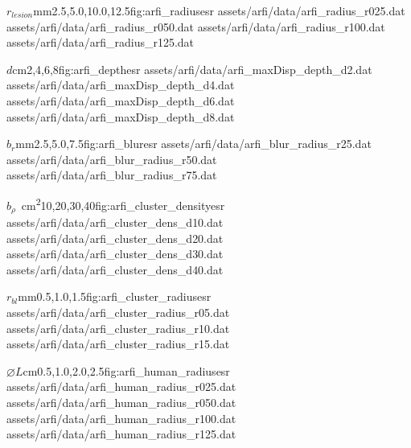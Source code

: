 		\begin{multicols*}{2}
			\characterizationDataTable%
				{$r_{lesion}$}{mm}{2.5,5.0,10.0,12.5}{fig:arfi_radius}{esr}%
				{assets/arfi/data/arfi_radius_r025.dat}%
				{assets/arfi/data/arfi_radius_r050.dat}%
				{assets/arfi/data/arfi_radius_r100.dat}%
				{assets/arfi/data/arfi_radius_r125.dat}

			\characterizationDataTable%
				{$d$}{cm}{2,4,6,8}{fig:arfi_depth}{esr}%
				{assets/arfi/data/arfi_maxDisp_depth_d2.dat}%
				{assets/arfi/data/arfi_maxDisp_depth_d4.dat}%
				{assets/arfi/data/arfi_maxDisp_depth_d6.dat}%
				{assets/arfi/data/arfi_maxDisp_depth_d8.dat}

			\characterizationDataTable%
				{$b_r$}{mm}{2.5,5.0,7.5}{fig:arfi_blur}{esr}%
				{assets/arfi/data/arfi_blur_radius_r25.dat}%
				{assets/arfi/data/arfi_blur_radius_r50.dat}%
				{assets/arfi/data/arfi_blur_radius_r75.dat}%
				{}

			\characterizationDataTable%
				{$b_\rho$}{\si{\per\cm\squared}}{10,20,30,40}{fig:arfi_cluster_density}{esr}%
				{assets/arfi/data/arfi_cluster_dens_d10.dat}%
				{assets/arfi/data/arfi_cluster_dens_d20.dat}%
				{assets/arfi/data/arfi_cluster_dens_d30.dat}%
				{assets/arfi/data/arfi_cluster_dens_d40.dat}

			\characterizationDataTable%
				{$r_{bl}$}{mm}{0.5,1.0,1.5}{fig:arfi_cluster_radius}{esr}%
				{assets/arfi/data/arfi_cluster_radius_r05.dat}%
				{assets/arfi/data/arfi_cluster_radius_r10.dat}%
				{assets/arfi/data/arfi_cluster_radius_r15.dat}%
				{}

			\characterizationDataTable%
				{$\diameter L$}{cm}{0.5,1.0,2.0,2.5}{fig:arfi_human_radius}{esr}%
				{assets/arfi/data/arfi_human_radius_r025.dat}%
				{assets/arfi/data/arfi_human_radius_r050.dat}%
				{assets/arfi/data/arfi_human_radius_r100.dat}%
				{assets/arfi/data/arfi_human_radius_r125.dat}
		\end{multicols*}

